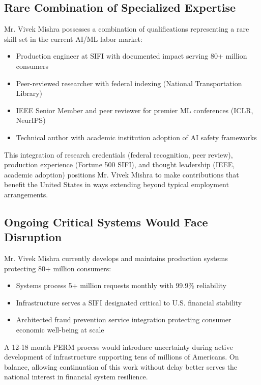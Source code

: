 \documentclass[11pt]{article}
\newcommand{\dr}{Mr. Vivek Mishra }
\begin{document}
\subsection{Rare Combination of Specialized Expertise}

\dr possesses a combination of qualifications representing a rare skill set in the current AI/ML labor market:

\begin{itemize}
    \item Production engineer at SIFI with documented impact serving 80+ million consumers
    \item Peer-reviewed researcher with federal indexing (National Transportation Library)
    \item IEEE Senior Member and peer reviewer for premier ML conferences (ICLR, NeurIPS)
    \item Technical author with academic institution adoption of AI safety frameworks
\end{itemize}

This integration of research credentials (federal recognition, peer review), production experience (Fortune 500 SIFI), and thought leadership (IEEE, academic adoption) positions \dr to make contributions that benefit the United States in ways extending beyond typical employment arrangements.

\subsection{Ongoing Critical Systems Would Face Disruption}

\dr currently develops and maintains production systems protecting 80+ million consumers:

\begin{itemize}
    \item Systems process 5+ million requests monthly with 99.9\% reliability
    \item Infrastructure serves a SIFI designated critical to U.S. financial stability
    \item Architected fraud prevention service integration protecting consumer economic well-being at scale
\end{itemize}

A 12-18 month PERM process would introduce uncertainty during active development of infrastructure supporting tens of millions of Americans. On balance, allowing continuation of this work without delay better serves the national interest in financial system resilience.
\end{document}
